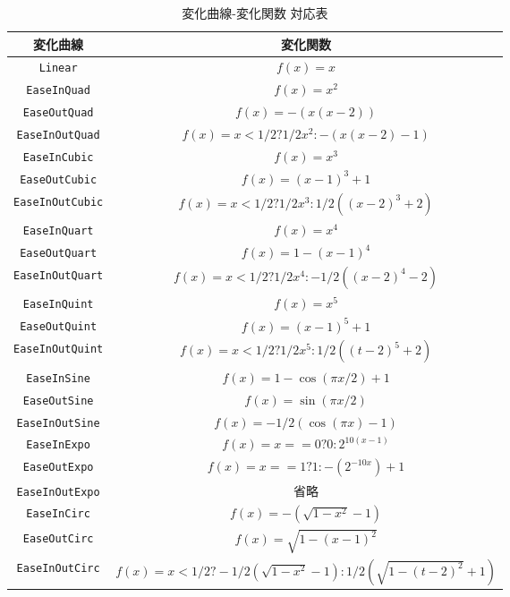 \documentclass[12pt]{jarticle}
\begin{document}
\begin{table*}[h]
	\centering
 	\begin{tabular}{|c|c|} \hline
		変化曲線 & 変化関数 \\ \hline
		\verb|Linear|			& $f(x) = x$ \\ \hline
		\verb|EaseInQuad|		& $f(x) = x^2$ \\ \hline
		\verb|EaseOutQuad|		& $f(x) = -(x(x-2))$ \\ \hline
		\verb|EaseInOutQuad|	& $f(x) = x < 1/2 ? 1/2 x^2 : -(x(x-2)-1)$ \\ \hline
		\verb|EaseInCubic|		& $f(x) = x^3$ \\ \hline
		\verb|EaseOutCubic|		& $f(x) = (x-1)^3 + 1$ \\ \hline
		\verb|EaseInOutCubic|	& $f(x) = x < 1/2 ? 1/2 x^3 : 1/2 ((x-2)^3 + 2)$ \\ \hline
		\verb|EaseInQuart|		& $f(x) = x^4$ \\ \hline
		\verb|EaseOutQuart|		& $f(x) = 1 - (x-1)^4$ \\ \hline
		\verb|EaseInOutQuart|	& $f(x) = x < 1/2 ? 1/2 x^4 : -1/2 ((x-2)^4 - 2)$ \\ \hline
		\verb|EaseInQuint|		& $f(x) = x^5$ \\ \hline
		\verb|EaseOutQuint|		& $f(x) = (x-1)^5 + 1$ \\ \hline
		\verb|EaseInOutQuint|	& $f(x) = x < 1/2 ? 1/2 x^5 : 1/2 ((t-2)^5 + 2)$ \\ \hline
		\verb|EaseInSine|		& $f(x) = 1 - \cos(\pi x / 2) + 1$ \\ \hline
		\verb|EaseOutSine|		& $f(x) = \sin(\pi x / 2)$ \\ \hline
		\verb|EaseInOutSine|	& $f(x) = -1/2 (\cos(\pi x) - 1)$ \\ \hline
		\verb|EaseInExpo|		& $f(x) = x == 0 ? 0 : 2^{10 (x-1)}$ \\ \hline
		\verb|EaseOutExpo|		& $f(x) = x == 1 ? 1 : -(2^{-10 x}) +1$ \\ \hline
		\verb|EaseInOutExpo|	& 省略 \\ \hline
		\verb|EaseInCirc|		& $f(x) = - (\sqrt{1 - x^2} - 1)$ \\ \hline
		\verb|EaseOutCirc|		& $f(x) = \sqrt{1 - (x-1)^2}$ \\ \hline
		\verb|EaseInOutCirc|	& $f(x) = x < 1/2 ? -1/2 (\sqrt{1 - x^2} - 1) : 1/2 (\sqrt{1-(t-2)^2} + 1)$ \\ \hline
	\end{tabular}
	\caption{変化曲線-変化関数 対応表}
	\label{table:easing_functions}
\end{table*}
\end{document}
